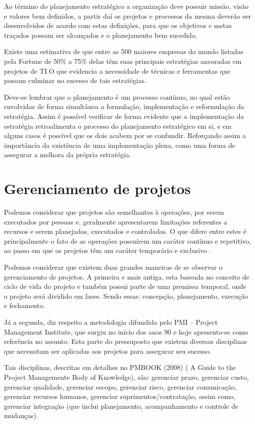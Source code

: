 \documentclass[12pt,a4paper,ruledheader,tocpage=prefix,floatnumber=continuous,pagestart=folhaderosto,font=times]{abnt}
\begin{document}
Ao término do planejamento estratégico a organização deve possuir missão, visão e valores bem definidos, a partir daí os projetos e processos da mesma
deverão ser desenvolvidos de acordo com estas definições, para que os objetivos e metas traçados possam ser alcançados e o planejamento bem sucedido.

Existe uma estimativa de que entre as 500 maiores empresas do mundo listadas pela Fortune de 50\% a 75\% delas têm suas principais estratégias ancoradas 
em projetos de TI.O que evidencia a necessidade de técnicas e ferramentas que possam culminar no sucesso de tais estratégias.

Deve-se lembrar que o planejamento é um processo contínuo, no qual estão envolvidas de forma simultânea a formulação, implementação e reformulação da
estratégia. Assim é possível verificar de forma evidente que a implementação da estratégia retroalimenta o processo do planejamento estratégico em si, 
e em alguns casos é possível que os dois acabem por se confundir. Reforçando assim a importância da existência de uma implementação plena, como uma forma
de assegurar a melhora da própria estratégia.

\chapter{Gerenciamento de projetos}
Podemos considerar que projetos são semelhantes à operações, por serem executados por pessoas e, geralmente apresentarem limitações referentes a recursos e
serem planejados, executados e controlados. O que difere entre estes é principalmente o fato de as operações possuírem um caráter contínuo e repetitivo, ao
passo em que os projetos têm um caráter temporário e exclusivo \cite{sppm}.

Podemos considerar que existem duas grandes maneiras de se observar o gerenciamento de projetos. A primeira e mais antiga, esta baseada no conceito de 
ciclo de vida do projeto e também possui parte de uma premissa temporal, onde o projeto será dividido em fases. Sendo essas: concepção, planejamento,
execução e fechamento.

Já a segunda, diz respeito a metodologia difundida pelo PMI – Project Management Institute, que surgiu no início dos anos 90 e hoje apresenta-se como
referência no assunto. Esta parte do pressuposto que existem diversas disciplinas que necessitam ser aplicadas aos projetos para assegurar seu sucesso.

Tais disciplinas, descritas em detalhes no PMBOOK (2008) ( A Guide to the Project Managemente Body of Knowledge), são: gerenciar prazo, gerenciar custo,
gerenciar qualidade, gerenciar escopo, gerenciar risco, gerenciar comunicação, gerenciar recursos humanos, gerenciar suprimentos/contratação, assim como,
gerenciar integração (que inclui planejamento, acompanhamento e controle de mudanças).
\end{document}
